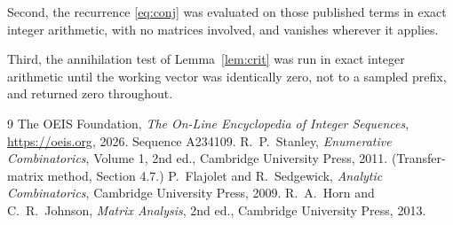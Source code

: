 \documentclass[11pt,a4paper]{article}
\theoremstyle{plain}
\theoremstyle{definition}
\begin{document}
Second, the recurrence \eqref{eq:conj} was evaluated on those published terms in exact
integer arithmetic, with no matrices involved, and vanishes wherever it applies.

Third, the annihilation test of Lemma~\ref{lem:crit} was run in exact integer arithmetic
until the working vector was identically zero, not to a sampled prefix, and returned zero
throughout.

\begin{thebibliography}{9}
 The OEIS Foundation, \emph{The On-Line Encyclopedia of Integer
Sequences}, \url{https://oeis.org}, 2026. Sequence A234109.
 R.~P.~Stanley, \emph{Enumerative Combinatorics}, Volume 1, 2nd ed.,
Cambridge University Press, 2011. (Transfer-matrix method, Section 4.7.)
 P.~Flajolet and R.~Sedgewick, \emph{Analytic Combinatorics}, Cambridge
University Press, 2009.
 R.~A.~Horn and C.~R.~Johnson, \emph{Matrix Analysis}, 2nd ed., Cambridge
University Press, 2013.
\end{thebibliography}
\end{document}
